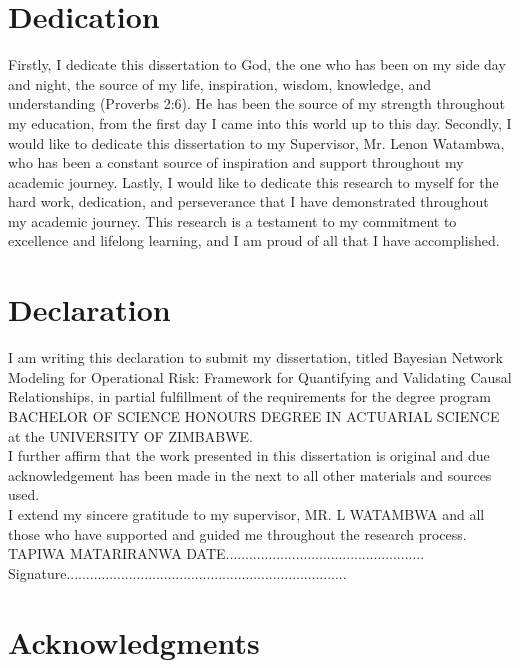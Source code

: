 \documentclass[12pt,a4paper]{extreport}
\begin{document}
\chapter*{Dedication}
Firstly, I dedicate this dissertation to God, the one who has been on my side day and night, the source 
of my life, inspiration, wisdom, knowledge, and understanding (Proverbs 2:6). He has been the 
source of my strength throughout my education, from the first day I came into this world up to this day.  
Secondly, I would like to dedicate this dissertation to my Supervisor, Mr. Lenon Watambwa, who has been a constant source of inspiration and support throughout my academic journey.  
Lastly, I would like to dedicate this research to myself for the hard work, dedication, and 
perseverance that I have demonstrated throughout my academic journey. This research is a 
testament to my commitment to excellence and lifelong learning, and I am proud of all that I have accomplished. 
	
\chapter*{Declaration}
I am writing this declaration to submit my dissertation, titled Bayesian Network Modeling for Operational Risk: Framework for Quantifying and Validating Causal Relationships, in partial fulfillment of the requirements for the degree program BACHELOR OF SCIENCE HONOURS DEGREE IN ACTUARIAL SCIENCE at the UNIVERSITY OF ZIMBABWE. \\

I further affirm that the work presented in this dissertation is original and due acknowledgement has been made in the next to all other materials and sources used. \\

I extend my sincere gratitude to my supervisor, MR. L WATAMBWA and all those who have supported and guided me throughout the research process.\\
 
TAPIWA MATARIRANWA
	\vfil
	\vfil
	\vfil
	DATE................................................... Signature........................................................................

\chapter*{Acknowledgments}
\end{document}
